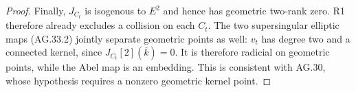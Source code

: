 \begin{proof}
Finally, $J_{C_t}$ is isogenous to $E^2$ and hence has
geometric two-rank zero. R1 therefore already excludes a
collision on each $C_t$. The two supersingular elliptic
maps (AG.33.2) jointly separate geometric points as well:
$v_t$ has degree two and a connected kernel, since
$J_{C_t}[2](\overline k)=0$. It is therefore radicial on
geometric points, while the Abel map is an
embedding. This is consistent with AG.30, whose hypothesis
requires a nonzero geometric kernel point.
\end{proof}
